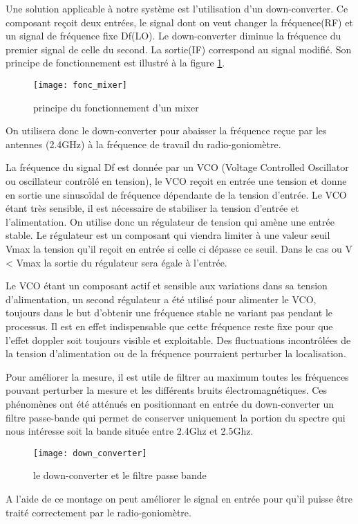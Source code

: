 Une solution applicable à notre système est l'utilisation d'un down-converter. Ce composant reçoit deux entrées, le signal dont on veut changer la fréquence(RF) et un signal de fréquence fixe Df(LO). Le down-converter diminue la fréquence du premier signal de celle du second. La sortie(IF) correspond au signal modifié. Son principe de fonctionnement est illustré à la figure \ref{fig:mix}.



\begin{figure}[h]
  \centering
  \texttt{[image: fonc\_mixer]}
  \caption{principe du fonctionnement d'un mixer}
  \label{fig:mix}
\end{figure}

On utilisera donc le down-converter pour abaisser la fréquence reçue par les antennes (2.4GHz) à la fréquence de travail du radio-goniomètre.

La fréquence du signal Df est donnée par un VCO (Voltage Controlled Oscillator ou oscillateur contrôlé en tension), le VCO reçoit en entrée une tension et donne en sortie une sinusoïdal de fréquence dépendante de la tension d’entrée. Le VCO étant très sensible, il est nécessaire de stabiliser la tension d’entrée et l’alimentation. On utilise donc un régulateur de tension qui amène une entrée stable. Le régulateur est un composant qui viendra limiter à une valeur seuil Vmax la tension qu'il reçoit en entrée si celle ci dépasse ce seuil. Dans le cas ou V < Vmax la sortie du régulateur sera égale à l'entrée.

Le VCO étant un composant actif et sensible aux variations dans sa tension d'alimentation, un second régulateur a été utilisé pour alimenter le VCO, toujours dans le but d’obtenir une fréquence stable ne variant pas pendant le processus. Il est en effet indispensable que cette fréquence reste fixe pour que l’effet doppler soit toujours visible et exploitable. Des fluctuations incontrôlées de la tension d'alimentation ou de la fréquence pourraient perturber la localisation.

Pour améliorer la mesure, il est utile de filtrer au maximum toutes les fréquences pouvant perturber la mesure et les différents bruits électromagnétiques. Ces phénomènes ont été atténués en positionnant en entrée du down-converter un filtre passe-bande qui permet de conserver uniquement la portion du spectre qui nous intéresse soit la bande située entre 2.4Ghz et 2.5Ghz.


\begin{figure}[h]
  \centering
  \texttt{[image: down\_converter]}
  \caption{le down-converter et le filtre passe bande}
  \label{fig:down}
\end{figure}

A l’aide de ce montage on peut améliorer le signal en entrée pour qu'il puisse être traité correctement par le radio-goniomètre.

